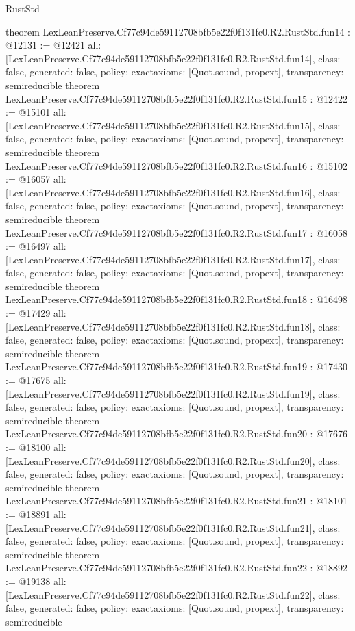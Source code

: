 \begin{lexlean}{RustStd}
\begin{coremodule}
{}
theorem LexLeanPreserve.Cf77c94de59112708bfb5e22f0f131fc0.R2.RustStd.fun14 : @12131 := @12421 {
  all: [LexLeanPreserve.Cf77c94de59112708bfb5e22f0f131fc0.R2.RustStd.fun14],
  class: false,
  generated: false,
  policy: exact{axioms: [Quot.sound, propext]},
  transparency: semireducible
}
theorem LexLeanPreserve.Cf77c94de59112708bfb5e22f0f131fc0.R2.RustStd.fun15 : @12422 := @15101 {
  all: [LexLeanPreserve.Cf77c94de59112708bfb5e22f0f131fc0.R2.RustStd.fun15],
  class: false,
  generated: false,
  policy: exact{axioms: [Quot.sound, propext]},
  transparency: semireducible
}
theorem LexLeanPreserve.Cf77c94de59112708bfb5e22f0f131fc0.R2.RustStd.fun16 : @15102 := @16057 {
  all: [LexLeanPreserve.Cf77c94de59112708bfb5e22f0f131fc0.R2.RustStd.fun16],
  class: false,
  generated: false,
  policy: exact{axioms: [Quot.sound, propext]},
  transparency: semireducible
}
theorem LexLeanPreserve.Cf77c94de59112708bfb5e22f0f131fc0.R2.RustStd.fun17 : @16058 := @16497 {
  all: [LexLeanPreserve.Cf77c94de59112708bfb5e22f0f131fc0.R2.RustStd.fun17],
  class: false,
  generated: false,
  policy: exact{axioms: [Quot.sound, propext]},
  transparency: semireducible
}
theorem LexLeanPreserve.Cf77c94de59112708bfb5e22f0f131fc0.R2.RustStd.fun18 : @16498 := @17429 {
  all: [LexLeanPreserve.Cf77c94de59112708bfb5e22f0f131fc0.R2.RustStd.fun18],
  class: false,
  generated: false,
  policy: exact{axioms: [Quot.sound, propext]},
  transparency: semireducible
}
theorem LexLeanPreserve.Cf77c94de59112708bfb5e22f0f131fc0.R2.RustStd.fun19 : @17430 := @17675 {
  all: [LexLeanPreserve.Cf77c94de59112708bfb5e22f0f131fc0.R2.RustStd.fun19],
  class: false,
  generated: false,
  policy: exact{axioms: [Quot.sound, propext]},
  transparency: semireducible
}
theorem LexLeanPreserve.Cf77c94de59112708bfb5e22f0f131fc0.R2.RustStd.fun20 : @17676 := @18100 {
  all: [LexLeanPreserve.Cf77c94de59112708bfb5e22f0f131fc0.R2.RustStd.fun20],
  class: false,
  generated: false,
  policy: exact{axioms: [Quot.sound, propext]},
  transparency: semireducible
}
theorem LexLeanPreserve.Cf77c94de59112708bfb5e22f0f131fc0.R2.RustStd.fun21 : @18101 := @18891 {
  all: [LexLeanPreserve.Cf77c94de59112708bfb5e22f0f131fc0.R2.RustStd.fun21],
  class: false,
  generated: false,
  policy: exact{axioms: [Quot.sound, propext]},
  transparency: semireducible
}
theorem LexLeanPreserve.Cf77c94de59112708bfb5e22f0f131fc0.R2.RustStd.fun22 : @18892 := @19138 {
  all: [LexLeanPreserve.Cf77c94de59112708bfb5e22f0f131fc0.R2.RustStd.fun22],
  class: false,
  generated: false,
  policy: exact{axioms: [Quot.sound, propext]},
  transparency: semireducible
}
\end{coremodule}
\end{lexlean}
